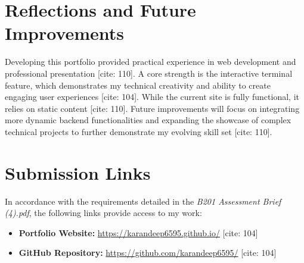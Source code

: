 \documentclass{article}
\begin{document}
\section{Reflections and Future Improvements}
Developing this portfolio provided practical experience in web development and professional presentation [cite: 110]. A core strength is the interactive terminal feature, which demonstrates my technical creativity and ability to create engaging user experiences [cite: 104]. While the current site is fully functional, it relies on static content [cite: 110]. Future improvements will focus on integrating more dynamic backend functionalities and expanding the showcase of complex technical projects to further demonstrate my evolving skill set [cite: 110].

\section{Submission Links}
In accordance with the requirements detailed in the \textit{B201 Assessment Brief (4).pdf}, the following links provide access to my work:
\begin{itemize}
    \item \textbf{Portfolio Website:} \url{https://karandeep6595.github.io/} [cite: 104]
    \item \textbf{GitHub Repository:} \url{https://github.com/karandeep6595/} [cite: 104]
\end{itemize}
\end{document}
